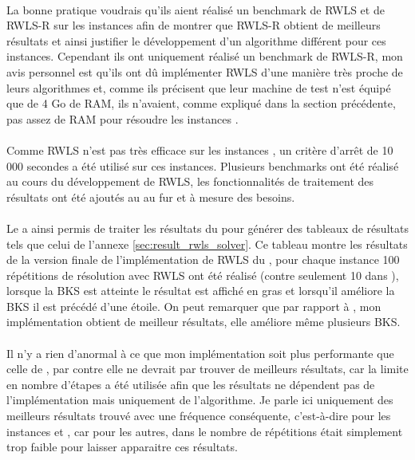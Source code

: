 \documentclass[a4paper,11pt,twoside,french,report]{../common/simplem}
\begin{document}
				\paragraph*{}
					La bonne pratique voudrais qu'ils aient réalisé un benchmark de \gls{RWLS} et de \gls{RWLS}-R sur les instances  afin de montrer que \gls{RWLS}-R obtient de meilleurs résultats et ainsi justifier le développement d'un algorithme différent pour ces instances. Cependant ils ont uniquement réalisé un benchmark de \gls{RWLS}-R, mon avis personnel est qu'ils ont dû implémenter \gls{RWLS} d'une manière très proche de leurs algorithmes et, comme ils précisent que leur machine de test n'est équipé que de 4 Go de RAM, ils n'avaient, comme expliqué dans la section précédente, pas assez de RAM pour résoudre les instances .
				\paragraph*{}
					Comme \gls{RWLS} n'est pas très efficace sur les instances , un critère d'arrêt de 10\,000 secondes a été utilisé sur ces instances. Plusieurs benchmarks ont été réalisé au cours du développement de \gls{RWLS}, les fonctionnalités de traitement des résultats ont été ajoutés au \printer{} au fur et à mesure des besoins.
				\paragraph*{}
					Le \printer{} a ainsi permis de traiter les résultats du \solver{} pour générer des tableaux de résultats tels que celui de l'annexe \ref{sec:result_rwls_solver}. Ce tableau montre les résultats de la version finale de l'implémentation de \gls{RWLS} du \solver{}, pour chaque instance 100 répétitions de résolution avec \gls{RWLS} ont été réalisé (contre seulement 10 dans \cite{Gao2015}), lorsque la \gls{BKS} est atteinte le résultat est affiché en gras et lorsqu'il améliore la \gls{BKS} il est précédé d'une étoile. On peut remarquer que par rapport à \cite{Gao2015}, mon implémentation obtient de meilleur résultats, elle améliore même plusieurs \gls{BKS}.
				\paragraph*{}
					Il n'y a rien d'anormal à ce que mon implémentation soit plus performante que celle de \cite{Gao2015}, par contre elle ne devrait par trouver de meilleurs résultats, car la limite en nombre d'étapes a été utilisée afin que les résultats ne dépendent pas de l'implémentation mais uniquement de l'algorithme. Je parle ici uniquement des meilleurs résultats trouvé avec une fréquence conséquente, c'est-à-dire pour les instances  et , car pour les autres, dans \cite{Gao2015} le nombre de répétitions était simplement trop faible pour laisser apparaitre ces résultats.
\end{document}
